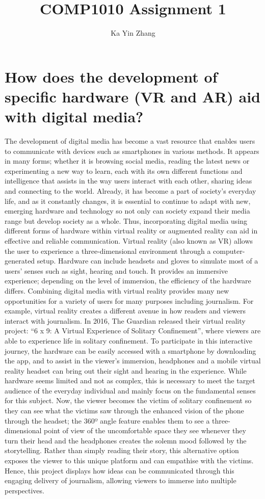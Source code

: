 \documentclass[12pt, times new roman]{article}
\title{\textbf{COMP1010 Assignment 1}}
\author{Ka Yin Zhang}
\begin{document}
\maketitle
\newpage
\section{How does the development of specific hardware (VR and AR) aid with digital media?}
The development of digital media has become a vast resource that enables users to communicate with devices such as smartphones in various methods. It appears in many forms; whether it is browsing social media, reading the latest news or experimenting a new way to learn, each with its own different functions and intelligence that assists in the way users interact with each other, sharing ideas and connecting to the world. Already, it has become a part of society’s everyday life, and as it constantly changes, it is essential to continue to adapt with new, emerging hardware and technology so not only can society expand their media range but develop society as a whole. Thus, incorporating digital media using different forms of hardware within virtual reality or augmented reality can aid in effective and reliable communication. 
\newline Virtual reality (also known as VR) allows the user to experience a three-dimensional environment through a computer-generated setup. Hardware can include headsets and gloves to simulate most of a users’ senses such as sight, hearing and touch. It provides an immersive experience; depending on the level of immersion, the efficiency of the hardware differs. Combining digital media with virtual reality provides many new opportunities for a variety of users for many purposes including journalism. 
\newline For example, virtual reality creates a different avenue in how readers and viewers interact with journalism. In 2016, The Guardian released their virtual reality project: “6 x 9: A Virtual Experience of Solitary Confinement”, where viewers are able to experience life in solitary confinement. To participate in this interactive journey, the hardware can be easily accessed with a smartphone by downloading the app, and to assist in the viewer’s immersion, headphones and a mobile virtual reality headset can bring out their sight and hearing in the experience. While hardware seems limited and not as complex, this is necessary to meet the target audience of the everyday individual and mainly focus on the fundamental senses for this subject. Now, the viewer becomes the victim of solitary confinement so they can see what the victims saw through the enhanced vision of the phone through the headset; the 360º angle feature enables them to see a three-dimensional point of view of the uncomfortable space they see whenever they turn their head and the headphones creates the solemn mood followed by the storytelling. Rather than simply reading their story, this alternative option exposes the viewer to this unique platform and can empathise with the victims. Hence, this project displays how ideas can be communicated through this engaging delivery of journalism, allowing viewers to immerse into multiple perspectives.
\end{document}
